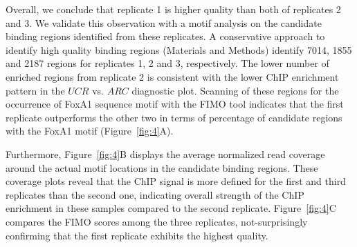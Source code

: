 \documentclass{bmcart}
\newcommand{\SK}[1]{\textcolor{red}{SK: #1}}
\newcommand{\RW}[1]{\textcolor{blue}{RW: #1}}
\begin{document}
Overall, we conclude that replicate 1 is higher quality than both of replicates 2 and 3.  We validate this observation with a motif analysis on the candidate binding regions identified from these replicates. A conservative approach to identify high quality binding regions (Materials and Methods) identify 7014, 1855 and 2187 regions for replicates 1, 2 and 3, respectively. The lower number of enriched regions from replicate 2 is consistent with the lower ChIP enrichment pattern in the $UCR$ vs. $ARC$ diagnostic plot. Scanning of these regions for the occurrence of FoxA1 sequence motif with the FIMO tool \cite{fimo} indicates that the first replicate outperforms the other two in terms of percentage of candidate regions with the FoxA1 motif  (Figure~\ref{fig:4}A).

Furthermore, Figure~\ref{fig:4}B displays the average normalized read coverage around the actual motif locations in the candidate binding regions. These coverage plots reveal that the ChIP signal is more defined for the first and third replicates than the second one, indicating overall strength of the ChIP enrichment in these samples compared to the second replicate. Figure~\ref{fig:4}C compares the FIMO scores among the three replicates, not-surprisingly confirming that the first replicate exhibits the highest quality. 
\end{document}
